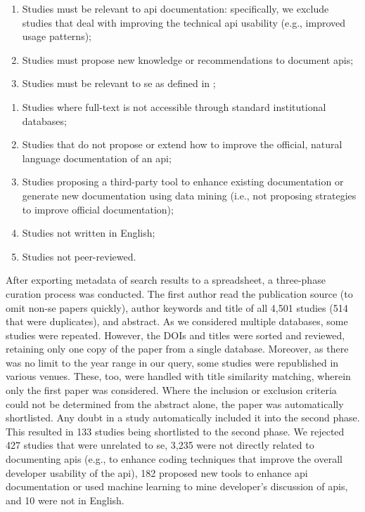\begin{enumerate}[leftmargin=4\parindent,label=\textbf{IC\arabic*}]
  \item Studies must be relevant to \gls{api} documentation: specifically, we exclude studies that deal with improving the technical \gls{api} usability (e.g., improved usage patterns);
  \item Studies must propose new knowledge or recommendations to document \glspl{api};
  \item Studies must be relevant to \gls{se} as defined in ;
\end{enumerate}
\begin{enumerate}[leftmargin=4\parindent,label=\textbf{EC\arabic*}]
  \item Studies where full-text is not accessible through standard institutional databases; 
  \item Studies that do not propose or extend how to improve the official, natural language documentation of an \gls{api};
  \item Studies proposing a third-party tool to enhance existing documentation or generate new documentation using data mining (i.e., not proposing strategies to improve official documentation);
  \item Studies not written in English;
  \item Studies not peer-reviewed.
\end{enumerate}
\smallskip

After exporting metadata of search results to a spreadsheet, a three-phase curation process was conducted. The first author read the publication source (to omit non-\gls{se} papers quickly), author keywords and title of all 4,501 studies (514 that were duplicates), and abstract. As we considered multiple databases, some studies were repeated. However, the DOIs and titles were sorted and reviewed, retaining only one copy of the paper from a single database. Moreover, as there was no limit to the year range in our query, some studies were republished in various venues. These, too, were handled with title similarity matching, wherein only the first paper was considered. Where the inclusion or exclusion criteria could not be determined from the abstract alone, the paper was automatically shortlisted. Any doubt in a study automatically included it into the second phase. This resulted in 133 studies being shortlisted to the second phase. We rejected 427 studies that were unrelated to \gls{se}, 3,235 were not directly related to documenting \glspl{api} (e.g., to enhance coding techniques that improve the overall developer usability of the \gls{api}), 182 proposed new tools to enhance \gls{api} documentation or used machine learning to mine developer's discussion of \glspl{api}, and 10 were not in English.

